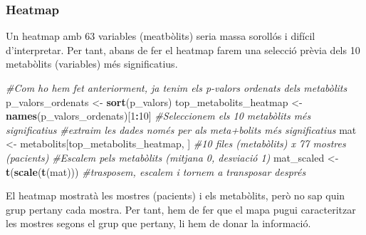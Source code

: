 \documentclass[
]{article}
\newenvironment{Shaded}{\begin{snugshade}}{\end{snugshade}}
\newcommand{\CommentTok}[1]{\textcolor[rgb]{0.56,0.35,0.01}{\textit{#1}}}
\newcommand{\DecValTok}[1]{\textcolor[rgb]{0.00,0.00,0.81}{#1}}
\newcommand{\FunctionTok}[1]{\textcolor[rgb]{0.13,0.29,0.53}{\textbf{#1}}}
\newcommand{\NormalTok}[1]{#1}
\newcommand{\OtherTok}[1]{\textcolor[rgb]{0.56,0.35,0.01}{#1}}
\newcommand{\SpecialCharTok}[1]{\textcolor[rgb]{0.81,0.36,0.00}{\textbf{#1}}}
\begin{document}
\subsubsection{Heatmap}\label{heatmap}

Un heatmap amb 63 variables (meatbòlits) seria massa sorollós i difícil
d'interpretar. Per tant, abans de fer el heatmap farem una selecció
prèvia dels 10 metabòlits (variables) més significatius.

\begin{Shaded}
\begin{Highlighting}[]
\CommentTok{\#Com ho hem fet anteriorment, ja tenim els p{-}valors ordenats dels metabòlits}
\NormalTok{p\_valors\_ordenats }\OtherTok{\textless{}{-}} \FunctionTok{sort}\NormalTok{(p\_valors)}
\NormalTok{top\_metabolits\_heatmap }\OtherTok{\textless{}{-}} \FunctionTok{names}\NormalTok{(p\_valors\_ordenats)[}\DecValTok{1}\SpecialCharTok{:}\DecValTok{10}\NormalTok{] }\CommentTok{\#Seleccionem els 10 metabòlits més significatius}
\CommentTok{\#extraim les dades només per als meta\textasciigrave{}+bolits més significatius}
\NormalTok{mat }\OtherTok{\textless{}{-}}\NormalTok{ metabolits[top\_metabolits\_heatmap, ] }\CommentTok{\#10 files (metabòlits) x 77 mostres (pacients)}
\CommentTok{\#Escalem pels metabòlits (mitjana 0, desviació 1)}
\NormalTok{mat\_scaled }\OtherTok{\textless{}{-}} \FunctionTok{t}\NormalTok{(}\FunctionTok{scale}\NormalTok{(}\FunctionTok{t}\NormalTok{(mat))) }\CommentTok{\#trasposem, escalem i tornem a transposar després}
\end{Highlighting}
\end{Shaded}

El heatmap mostratà les mostres (pacients) i els metabòlits, però no sap
quin grup pertany cada mostra. Per tant, hem de fer que el mapa pugui
caracteritzar les mostres segons el grup que pertany, li hem de donar la
informació.
\end{document}
